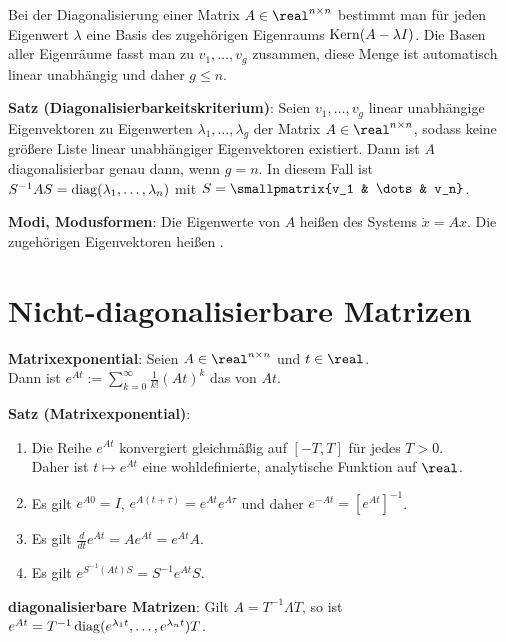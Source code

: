 \linie

Bei der Diagonalisierung einer Matrix $A \in \real^{n \times n}$ bestimmt man für jeden
Eigenwert $\lambda$ eine Basis des zugehörigen Eigenraums $\operatorname{Kern}(A - \lambda I)$.
Die Basen aller Eigenräume fasst man zu $v_1, \dotsc, v_g$ zusammen,
diese Menge ist automatisch linear unabhängig und daher $g \le n$.

\textbf{Satz (Diagonalisierbarkeitskriterium)}:
Seien $v_1, \dotsc, v_g$ linear unabhängige Eigenvektoren zu Eigenwerten
$\lambda_1, \dotsc, \lambda_g$ der Matrix $A \in \real^{n \times n}$,
sodass keine größere Liste linear unabhängiger Eigenvektoren existiert.
Dann ist $A$ diagonalisierbar genau dann, wenn $g = n$.
In diesem Fall ist $S^{-1} A S = \operatorname{diag}(\lambda_1, \dotsc, \lambda_n)$ mit
$S = \smallpmatrix{v_1 & \dots & v_n}$.

\textbf{Modi, Modusformen}:
Die Eigenwerte von $A$ heißen  des Systems $\dot{x} = Ax$.
Die zugehörigen Eigenvektoren heißen .

\section{%
    Nicht-diagonalisierbare Matrizen%
}

\textbf{Matrixexponential}:
Seien $A \in \real^{n \times n}$ und $t \in \real$.\\
Dann ist $e^{At} := \sum_{k=0}^\infty \frac{1}{k!} (At)^k$ das 
von $At$.

\textbf{Satz (Matrixexponential)}:
\begin{enumerate}
    \item
    Die Reihe $e^{At}$ konvergiert gleichmäßig auf $[-T, T]$ für jedes $T > 0$.\\
    Daher ist $t \mapsto e^{At}$ eine wohldefinierte, analytische Funktion auf $\real$.

    \item
    Es gilt $e^{A0} = I$, $e^{A(t + \tau)} = e^{At} e^{A\tau}$ und daher $e^{-At} = [e^{At}]^{-1}$.

    \item
    Es gilt $\frac{d}{dt} e^{At} = A e^{At} = e^{At} A$.

    \item
    Es gilt $e^{S^{-1} (At) S} = S^{-1} e^{At} S$.
\end{enumerate}

\textbf{diagonalisierbare Matrizen}:
Gilt $A = T^{-1} \Lambda T$, so ist
$e^{At} = T^{-1} \operatorname{diag}(e^{\lambda_1 t}, \dotsc, e^{\lambda_n t}) T$.

